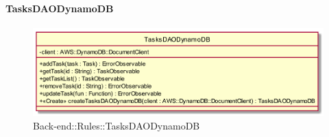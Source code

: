 \hypertarget{TasksDAODynamoDB_label}{\paragraph{TasksDAODynamoDB}}
\begin{figure}[h]
	\centering
	\includegraphics[width=\textwidth,height=\textheight,keepaspectratio]{images/ClassTasksDAODynamoDB.png}
	\caption{Back-end::Rules::TasksDAODynamoDB}
\end{figure}
